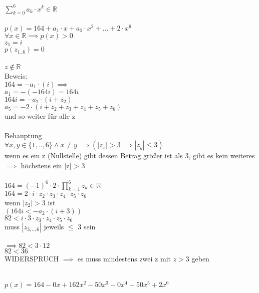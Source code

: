 \( \displaystyle\sum_{k=0}^{6} {a_k\cdot x^k} \in \mathbb{R}  \)
 \\
 \\
\(p(x) = 164 + a_{1} \cdot x + a_{2} \cdot x^2 + ... + 2 \cdot x^6\)\\
\(\forall x \in \mathbb{R} \implies p(x) > 0 \) \\
\(z_{1}=i\)\\
\(p(z_{1..6})=0 \)\\
\\\(z \notin \mathbb{R}\) \\ Beweis:\\
\(164 = -a_{1}  \cdot (i) \implies  \)\\
\(a_{1} = -(-164i) = 164i\)\\
\(164i = -a_{2}  \cdot (i + z_{2})\)\\
\(a_{5} = -2  \cdot (i +z_{2}+z_{3}+z_{4}+z_{5}+z_{6})\)\\
und so weiter für alle z\\
 \\
Behauptung\\
\(\forall x,y \in \{1,.. ,6\} \land x \neq y \implies (|z_{x}| > 3 \implies |z_{y}| \leq 3 )\) \\
wenn es ein z (Nullstelle) gibt dessen Betrag größer ist als 3, gibt es kein weiteres \(\implies\)
höchstens ein |z| > 3\\
 \\
\(164 = (-1)^6  \cdot 2  \cdot \displaystyle\prod_{k=1}^{6} {z_{k}} \in \mathbb{R}\)\\
\(164 = 2  \cdot i  \cdot z_{2}\cdot  z_{3}\cdot  z_{4}\cdot  z_{5}\cdot  z_{6}\)\\
wenn \(|z_{2}| > 3 \) ist\\
\((164i < -a_{2}  \cdot (i + 3))\)\\
\(82 < i  \cdot  3  \cdot z_{3} \cdot z_{4} \cdot z_{5} \cdot z_{6}  \)\\
muss \(|z_{3,..,6}|\) jeweils \(\leq\) 3 sein\\
 \\
\(\implies 82 < 3 \cdot 12 \)  \\
\(82 < 36\)\\
WIDERSPRUCH  \(\implies\) es muss mindestens zwei z mit \(z > 3\) geben\\


\item~\\
\(p(x)=164-0x+162x^2-50x^3-0x^4-50x^5+2x^6\)
